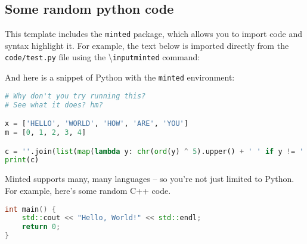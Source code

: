 %
\begin{appendices}


\chapter{Some random python code}
This template includes the \texttt{minted} package, which allows you to import code and syntax highlight it. For example, the text below is imported directly from the \texttt{code/test.py} file using the \textbackslash\texttt{inputminted} command:

\begin{framed}

\end{framed}

And here is a snippet of Python with the \texttt{minted} environment:

\begin{framed}
\begin{lstlisting}[language=Python, breaklines=true]
# Why don't you try running this?
# See what it does? hm?

x = ['HELLO', 'WORLD', 'HOW', 'ARE', 'YOU']
m = [0, 1, 2, 3, 4]

c = ''.join(list(map(lambda y: chr(ord(y) ^ 5).upper() + ' ' if y != ' ' else '  ', ' '.join([ x[m[i]] for i, v in enumerate(m) ]))))
print(c)
\end{lstlisting}
\end{framed}

\cleardoublepage
Minted supports many, many languages -- so you're not just limited to Python. For example, here's some random C++ code.

\begin{framed}
\begin{lstlisting}[language=C++, breaklines=true]
int main() {
    std::cout << "Hello, World!" << std::endl;
    return 0;
}
\end{lstlisting}
\end{framed}








\end{appendices}
